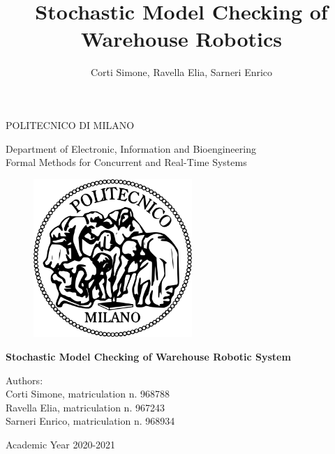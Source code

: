 \documentclass{article}
\title{Stochastic Model Checking of Warehouse Robotics}
\author{Corti Simone, Ravella Elia, Sarneri Enrico}
\begin{document}
	\begin{titlepage}

		\thispagestyle{empty}
		\vspace*{-1.5cm} \bfseries{
			\begin{center}
				\LARGE
				POLITECNICO DI MILANO\\
				\vspace*{.3truecm}
				
				\large				
				Department of Electronic, Information and Bioengineering\\
				\vspace*{.1truecm}
				Formal Methods for Concurrent and Real-Time Systems\\
				\vspace*{.75truecm}
				
				\begin{figure}[htbp]
					\begin{center}
						\includegraphics[width=6cm]{./Images/logo_poli.png}
					\end{center}
				\end{figure}
				
				\vspace*{0.8cm} 
				\LARGE
				\textbf{Stochastic Model Checking of Warehouse Robotic System}\\
				\vspace*{4.5truecm}
			\end{center}
		}
		
		\mdseries
		
		\begin{center}
			\large
			Authors:\\ Corti Simone, matriculation n. 968788 \\ 
			Ravella Elia, matriculation n. 967243 \\
			Sarneri Enrico, matriculation n. 968934 \\

			\vspace*{1cm}

			Academic Year 2020-2021
		\end{center} 

    \end{titlepage}
	\clearpage
	
\end{document}

